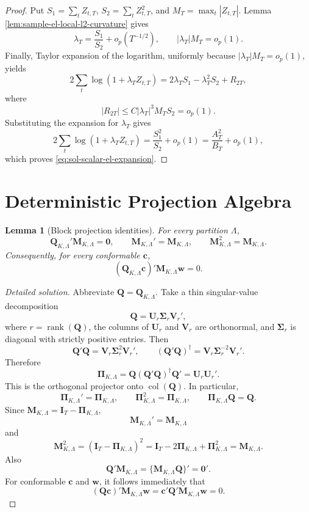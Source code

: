 \documentclass[12pt]{article}
\numberwithin{equation}{section}
\newtheorem{lemma}{Lemma}
\theoremstyle{definition}
\begin{document}
\begin{proof}
Put
\(S_1=\sum_tZ_{t,T}\), \(S_2=\sum_tZ_{t,T}^2\), and
\(M_T=\max_t|Z_{t,T}|\).  Lemma \ref{lem:sample-el-local-l2-curvature} gives
\[
    \lambda_T=\frac{S_1}{S_2}+o_p(T^{-1/2}),
    \qquad
    |\lambda_T|M_T=o_p(1).
\]
Finally, Taylor expansion of the logarithm, uniformly because
\(|\lambda_T|M_T=o_p(1)\), yields
\[
    2\sum_t\log(1+\lambda_TZ_{t,T})
    =2\lambda_TS_1-\lambda_T^2S_2+R_{2T},
\]
where
\[
    |R_{2T}|
    \leq C|\lambda_T|^3M_TS_2=o_p(1).
\]
Substituting the expansion for \(\lambda_T\) gives
\[
    2\sum_t\log(1+\lambda_TZ_{t,T})
    =\frac{S_1^2}{S_2}+o_p(1)
    =\frac{A_T^2}{B_T}+o_p(1),
\]
which proves \eqref{eq:sol-scalar-el-expansion}.
\end{proof}

\section{Deterministic Projection Algebra}

\begin{lemma}[Block projection identities]
\label{lem:wb-projection}
For every partition \(\Lambda\),
\[
    \bm Q_{K,\Lambda}'\bm M_{K,\Lambda}=\bm0,
    \qquad
    \bm M_{K,\Lambda}'=\bm M_{K,\Lambda},
    \qquad
    \bm M_{K,\Lambda}^2=\bm M_{K,\Lambda}.
\]
Consequently, for every conformable \(\bm c\),
\[
    (\bm Q_{K,\Lambda}\bm c)'\bm M_{K,\Lambda}\bm w=0.
\]
\end{lemma}


\begin{proof}[Detailed solution]
Abbreviate \(\bm Q=\bm Q_{K,\Lambda}\).  Take a thin singular-value
decomposition
\[
    \bm Q=\bm U_r\bm\Sigma_r\bm V_r',
\]
where \(r=\operatorname{rank}(\bm Q)\), the columns of \(\bm U_r\) and
\(\bm V_r\) are orthonormal, and \(\bm\Sigma_r\) is diagonal with strictly
positive entries.  Then
\[
    \bm Q'\bm Q
    =\bm V_r\bm\Sigma_r^2\bm V_r',
    \qquad
    (\bm Q'\bm Q)^\dagger
    =\bm V_r\bm\Sigma_r^{-2}\bm V_r'.
\]
Therefore
\[
    \bm\Pi_{K,\Lambda}
    =\bm Q(\bm Q'\bm Q)^\dagger\bm Q'
    =\bm U_r\bm U_r'.
\]
This is the orthogonal projector onto \(\operatorname{col}(\bm Q)\).  In
particular,
\[
    \bm\Pi_{K,\Lambda}'=\bm\Pi_{K,\Lambda},
    \qquad
    \bm\Pi_{K,\Lambda}^2=\bm\Pi_{K,\Lambda},
    \qquad
    \bm\Pi_{K,\Lambda}\bm Q=\bm Q.
\]
Since \(\bm M_{K,\Lambda}=\bm I_T-\bm\Pi_{K,\Lambda}\),
\[
    \bm M_{K,\Lambda}'=\bm M_{K,\Lambda}
\]
and
\[
    \bm M_{K,\Lambda}^2
    =(\bm I_T-\bm\Pi_{K,\Lambda})^2
    =\bm I_T-2\bm\Pi_{K,\Lambda}+\bm\Pi_{K,\Lambda}^2
    =\bm M_{K,\Lambda}.
\]
Also
\[
    \bm Q'\bm M_{K,\Lambda}
    =\{\bm M_{K,\Lambda}\bm Q\}'
    =\bm0'.
\]
For conformable \(\bm c\) and \(\bm w\), it follows immediately that
\[
    (\bm Q\bm c)'\bm M_{K,\Lambda}\bm w
    =\bm c'\bm Q'\bm M_{K,\Lambda}\bm w=0.
\]
\end{proof}
\end{document}
